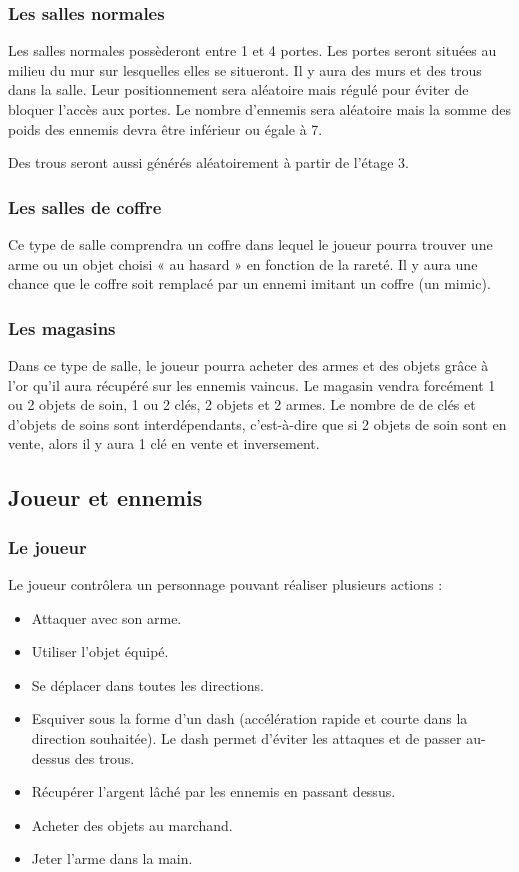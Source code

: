 \documentclass[]{extarticle}
\begin{document}
\newpage
		\subsubsection{Les salles normales}
\bigbreak
\bigbreak
Les salles normales possèderont entre 1 et 4 portes. Les portes seront situées au milieu du mur sur lesquelles elles se situeront. Il y aura des murs et des trous dans la salle. Leur positionnement sera aléatoire mais régulé pour éviter de bloquer l’accès aux portes. Le nombre d’ennemis sera aléatoire mais la somme des poids des ennemis devra être inférieur ou égale à 7.

Des trous seront aussi générés aléatoirement à partir de l'étage 3.
\bigbreak

		\subsubsection{Les salles de coffre}
\bigbreak
\bigbreak
Ce type de salle comprendra un coffre dans lequel le joueur pourra trouver une arme ou un objet choisi « au hasard » en fonction de la rareté. Il y aura une chance que le coffre soit remplacé par un ennemi imitant un coffre (un mimic).
\bigbreak

		\subsubsection{Les magasins}
\bigbreak
\bigbreak
Dans ce type de salle, le joueur pourra acheter des armes et des objets grâce à l’or qu’il aura récupéré sur les ennemis vaincus. Le magasin vendra forcément 1 ou 2 objets de soin, 1 ou 2 clés, 2 objets et 2 armes. Le nombre de de clés et d’objets de soins sont interdépendants, c’est-à-dire que si 2 objets de soin sont en vente, alors il y aura 1 clé en vente et inversement.
\bigbreak
	\subsection{Joueur et ennemis}
		\subsubsection{Le joueur}
		\bigbreak
		\bigbreak
Le joueur contrôlera un personnage pouvant réaliser plusieurs actions :
\begin{itemize}
\item Attaquer avec son arme.
\item Utiliser l’objet équipé.
\item Se déplacer dans toutes les directions.
\item Esquiver sous la forme d’un dash (accélération rapide et courte dans la direction souhaitée). Le dash permet d’éviter les attaques et de passer au-dessus des trous.
\item Récupérer l’argent lâché par les ennemis en passant dessus.
\item Acheter des objets au marchand.
\item Jeter l’arme dans la main.
\end{itemize}
\end{document}
